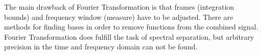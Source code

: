 \documentclass{report}
\begin{document}
The main drawback of Fourier Transformation is that frames (integration bounds) and frequency window (measure) have to be adjusted. There are methods for finding bases in order to remove functions from the combined signal. Fourier Transformation does fulfill the task of spectral separation, but arbitrary precision in the time and frequency domain can not be found.

\iffalse
\printbibliography
\fi
{}

\end{document}
